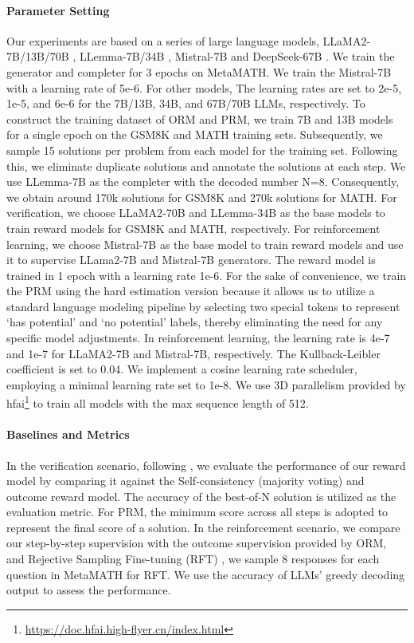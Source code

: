 \paragraph{Parameter Setting}
\label{sec:param}
Our experiments are based on a series of large language models, LLaMA2-7B/13B/70B \citep{LLaMA}, LLemma-7B/34B \citep{azerbayev2023llemma}, Mistral-7B \citep{jiang2023mistral} and DeepSeek-67B \citep{DeepSeek-llm}. We train the generator and completer for 3 epochs on MetaMATH. We train the Mistral-7B with a learning rate of 5e-6. For other models, The learning rates are set to 2e-5, 1e-5, and 6e-6 for the 7B/13B, 34B, and 67B/70B LLMs, respectively. To construct the training dataset of ORM and PRM, we train 7B and 13B models for a single epoch on the GSM8K and MATH training sets. Subsequently, we sample 15 solutions per problem from each model for the training set. Following this, we eliminate duplicate solutions and annotate the solutions at each step. We use LLemma-7B as the completer with the decoded number N=8. Consequently, we obtain around 170k solutions for GSM8K and 270k solutions for MATH. For verification, we choose LLaMA2-70B and LLemma-34B as the base models to train reward models for GSM8K and MATH, respectively. For reinforcement learning, we choose Mistral-7B as the base model to train reward models and use it to supervise LLama2-7B and Mistral-7B generators. The reward model is trained in 1 epoch with a learning rate 1e-6. For the sake of convenience, we train the PRM using the hard estimation version because it allows us to utilize a standard language modeling pipeline by selecting two special tokens to represent `has potential' and `no potential' labels, thereby eliminating the need for any specific model adjustments. In reinforcement learning, the learning rate is 4e-7 and 1e-7 for LLaMA2-7B and Mistral-7B, respectively. The Kullback-Leibler coefficient is set to 0.04. We implement a cosine learning rate scheduler, employing a minimal learning rate set to 1e-8. We use 3D parallelism provided by hfai\footnote{\url{https://doc.hfai.high-flyer.cn/index.html}} to train all models with the max sequence length of 512. 

\paragraph{Baselines and Metrics} In the verification scenario, following \citep{lightman2023let}, we evaluate the performance of our reward model by comparing it against the Self-consistency (majority voting) and outcome reward model. The accuracy of the best-of-N solution is utilized as the evaluation metric. For PRM, the minimum score across all steps is adopted to represent the final score of a solution. In the reinforcement scenario, we compare our step-by-step supervision with the outcome supervision provided by ORM, and Rejective Sampling Fine-tuning (RFT) \citep{yuan2023scaling}, we sample 8 responses for each question in MetaMATH for RFT. We use the accuracy of LLMs' greedy decoding output to assess the performance.

